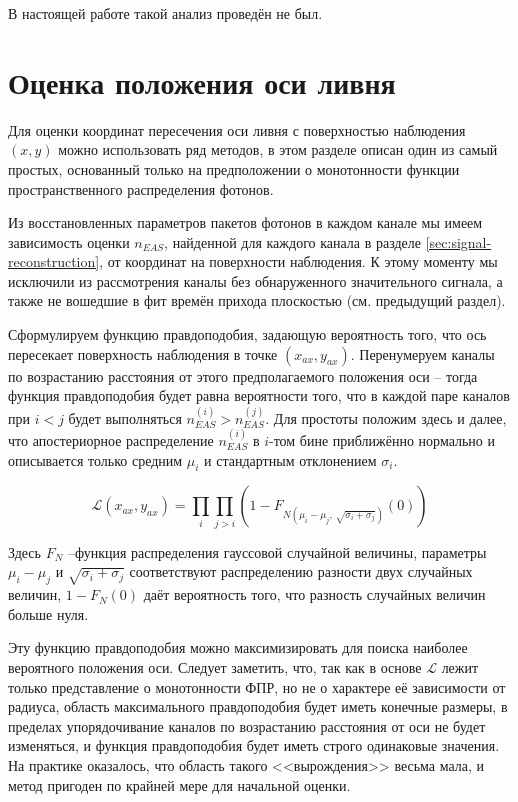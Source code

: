 В настоящей работе такой анализ проведён не был.

\section{Оценка положения оси ливня}

Для оценки координат пересечения оси ливня с поверхностью наблюдения $(x, y)$ можно использовать ряд методов, в этом разделе описан один из самый простых, основанный только на предположении о монотонности функции пространственного распределения фотонов.

Из восстановленных параметров пакетов фотонов в каждом канале мы имеем зависимость оценки $n_{EAS}$, найденной для каждого канала в разделе \ref{sec:signal-reconstruction}, от координат на поверхности наблюдения. К этому моменту мы исключили из рассмотрения каналы без обнаруженного значительного сигнала, а также не вошедшие в фит времён прихода плоскостью (см. предыдущий раздел).

Сформулируем функцию правдоподобия, задающую вероятность того, что ось пересекает поверхность наблюдения в точке $(x_{ax}, y_{ax})$. Перенумеруем каналы по возрастанию расстояния от этого предполагаемого положения оси -- тогда функция правдоподобия будет равна вероятности того, что в каждой паре каналов при $i < j$ будет выполняться $n_{EAS}^{(i)} > n_{EAS}^{(j)}$. Для простоты положим здесь и далее, что апостериорное распределение $n_{EAS}^{(i)}$ в $i$-том бине приближённо нормально и описывается только средним $\mu_i$ и стандартным отклонением $\sigma_i$.

\begin{equation}
	\mathcal{L}(x_{ax}, y_{ax}) = \prod_i \prod_{j > i} \left( 1 - F_{N(\mu_i - \mu_j, \, \sqrt{\sigma_i + \sigma_j})} (0) \right)
\end{equation}

Здесь $F_N$ --функция распределения гауссовой случайной величины, параметры $\mu_i - \mu_j$ и $\sqrt{\sigma_i + \sigma_j}$ соответствуют распределению разности двух случайных величин, $1 - F_N(0)$ даёт вероятность того, что разность случайных величин больше нуля.

Эту функцию правдоподобия можно максимизировать для поиска наиболее вероятного положения оси. Следует заметить, что, так как в основе $\mathcal{L}$ лежит только представление о монотонности ФПР, но не о характере её зависимости от радиуса, область максимального правдоподобия будет иметь конечные размеры, в пределах упорядочивание каналов по возрастанию расстояния от оси не будет изменяться, и функция правдоподобия будет иметь строго одинаковые значения. На практике оказалось, что область такого <<вырождения>> весьма мала, и метод пригоден по крайней мере для начальной оценки.

